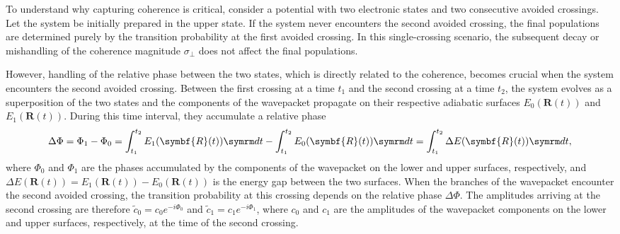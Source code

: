 To understand why capturing coherence is critical, consider a potential with two electronic states and two consecutive avoided crossings. Let the system be initially prepared in the upper state. If the system never encounters the second avoided crossing, the final populations are determined purely by the transition probability at the first avoided crossing. In this single-crossing scenario, the subsequent decay or mishandling of the coherence magnitude $\sigma_\perp$ does not affect the final populations.

However, handling of the relative phase between the two states, which is directly related to the coherence, becomes crucial when the system encounters the second avoided crossing. Between the first crossing at a time $t_1$ and the second crossing at a time $t_2$, the system evolves as a superposition of the two states and the components of the wavepacket propagate on their respective adiabatic surfaces $E_0(\symbf{R}(t))$ and $E_1(\symbf{R}(t))$. During this time interval, they accumulate a relative phase
\begin{equation}
\Delta\Phi=\Phi_1-\Phi_0=\int_{t_1}^{t_2}E_1(\symbf{R}(t))\dt-\int_{t_1}^{t_2}E_0(\symbf{R}(t))\dt=\int_{t_1}^{t_2}\Delta E(\symbf{R}(t))\dt,
\end{equation}
where $\Phi_0$ and $\Phi_1$ are the phases accumulated by the components of the wavepacket on the lower and upper surfaces, respectively, and $\Delta E(\symbf{R}(t))=E_1(\symbf{R}(t))-E_0(\symbf{R}(t))$ is the energy gap between the two surfaces. When the branches of the wavepacket encounter the second avoided crossing, the transition probability at this crossing depends on the relative phase $\Delta\Phi$. The amplitudes arriving at the second crossing are therefore $\tilde c_0=c_0e^{-i\Phi_0}$ and $\tilde c_1=c_1e^{-i\Phi_1}$, where $c_0$ and $c_1$ are the amplitudes of the wavepacket components on the lower and upper surfaces, respectively, at the time of the second crossing.

